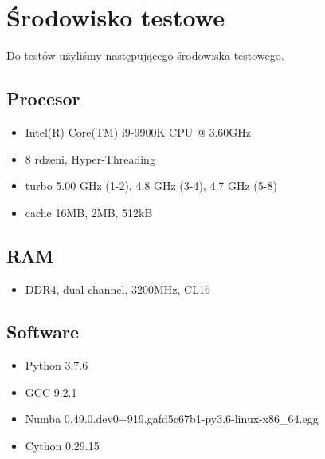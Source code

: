 \section{Środowisko testowe}

Do testów użyliśmy następującego środowiska testowego.


\subsection{Procesor}
    \begin{itemize}
        \item Intel(R) Core(TM) i9-9900K CPU @ 3.60GHz
        \item 8 rdzeni, Hyper-Threading
        \item turbo 5.00 GHz (1-2), 4.8 GHz (3-4), 4.7 GHz (5-8)
        \item cache 16MB, 2MB, 512kB
    \end{itemize}

\subsection{RAM}
    \begin{itemize}
        \item DDR4, dual-channel, 3200MHz, CL16
    \end{itemize}

\subsection{Software}
    \begin{itemize}
        \item Python 3.7.6
        \item GCC 9.2.1
        \item Numba 0.49.0.dev0+919.gafd5c67b1-py3.6-linux-x86\_64.egg
        \item Cython 0.29.15
    \end{itemize}